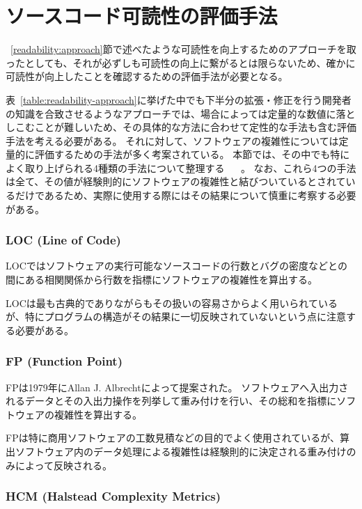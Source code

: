 \section{ソースコード可読性の評価手法}
\label{readability:evaluation}

~\ref{readability:approach}節で述べたような可読性を向上するためのアプローチを取ったとしても、それが必ずしも可読性の向上に繋がるとは限らないため、確かに可読性が向上したことを確認するための評価手法が必要となる。

表~\ref{table:readability-approach}に挙げた中でも下半分の拡張・修正を行う開発者の知識を合致させるようなアプローチでは、場合によっては定量的な数値に落としこむことが難しいため、その具体的な方法に合わせて定性的な手法も含む評価手法を考える必要がある。
それに対して、ソフトウェアの複雑性については定量的に評価するための手法が多く考案されている。
本節では、その中でも特によく取り上げられる4種類の手法について整理する ~\cite{yu} ~\cite{symons}。
なお、これら4つの手法は全て、その値が経験則的にソフトウェアの複雑性と結びついているとされているだけであるため、実際に使用する際にはその結果について慎重に考察する必要がある。

\subsubsection{LOC (Line of Code)}

LOCではソフトウェアの実行可能なソースコードの行数とバグの密度などとの間にある相関関係から行数を指標にソフトウェアの複雑性を算出する。

LOCは最も古典的でありながらもその扱いの容易さからよく用いられているが、特にプログラムの構造がその結果に一切反映されていないという点に注意する必要がある。

\subsubsection{FP (Function Point)}

FPは1979年にAllan J. Albrechtによって提案された。
ソフトウェアへ入出力されるデータとその入出力操作を列挙して重み付けを行い、その総和を指標にソフトウェアの複雑性を算出する。

FPは特に商用ソフトウェアの工数見積などの目的でよく使用されているが、算出ソフトウェア内のデータ処理による複雑性は経験則的に決定される重み付けのみによって反映される。

\subsubsection{HCM (Halstead Complexity Metrics)}

